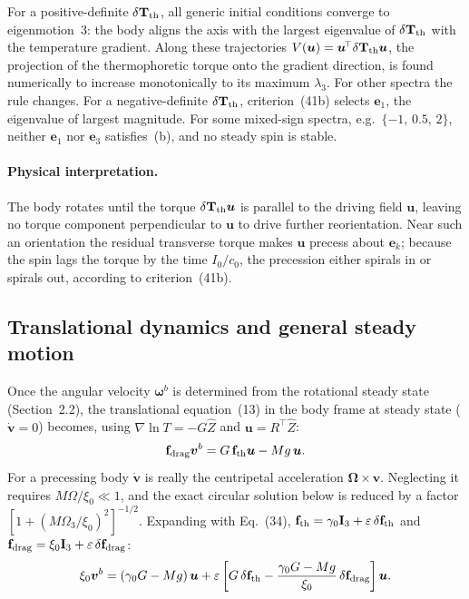 \documentclass[11pt]{article}
\newcommand{\chg}[1]{\marginpar{\raggedright\footnotesize\textcolor{red!70!black}{\textsf{#1}}}}
\newcommand{\vect}[1]{\bm{#1}}
\newcommand{\T}{^{\!\top}}
\begin{document}
For a positive-definite $\delta\mathbf T_{\rm th}$, all generic initial conditions converge to eigenmotion~3: the body aligns the axis with the largest eigenvalue of $\delta\mathbf T_{\rm th}$ with the temperature gradient. Along these trajectories $V(\vect u)=\vect u\T\delta\mathbf T_{\rm th}\vect u$, the projection of the thermophoretic torque onto the gradient direction, is found numerically to increase monotonically to its maximum $\lambda_3$. For other spectra the rule changes. For a negative-definite $\delta\mathbf T_{\rm th}$, criterion~(41b) selects $\vect e_1$, the eigenvalue of largest magnitude. For some mixed-sign spectra, e.g.\ $\{-1,\,0.5,\,2\}$, neither $\vect e_1$ nor $\vect e_3$ satisfies~(b), and no steady spin is stable.

\paragraph{Physical interpretation.} The body rotates until the torque $\delta\mathbf T_{\rm th}\vect u$ is parallel to the driving field $\vect u$, leaving no torque component perpendicular to $\vect u$ to drive further reorientation. Near such an orientation the residual transverse torque makes $\vect u$ precess about $\vect e_k$; because the spin lags the torque by the time $I_0/c_0$, the precession either spirals in or spirals out, according to criterion~(41b).

\subsection{Translational dynamics and general steady motion}
Once the angular velocity $\vect\omega^b$ is determined from the rotational steady state (Section~2.2), the translational equation~(13) in the body frame at steady state ($\dot{\vect v}=0$) becomes, using $\nabla\ln T=-G\hat Z$ and $\vect u=R\T\hat Z$:
\begin{equation}
  \mathbf f_{\rm drag}\vect v^b=G\,\mathbf f_{\rm th}\vect u-Mg\,\vect u.
\end{equation}
For a precessing body $\dot{\vect v}$ is really the centripetal acceleration $\vect\Omega\times\vect v$. Neglecting it requires $M\Omega/\xi_0\ll1$, and the exact circular solution below is reduced by a factor $[1+(M\Omega_3/\xi_0)^2]^{-1/2}$.\chg{C12} Expanding with Eq.~(34), $\mathbf f_{\rm th}=\gamma_0\mathbf I_3+\varepsilon\,\delta\mathbf f_{\rm th}$ and $\mathbf f_{\rm drag}=\xi_0\mathbf I_3+\varepsilon\,\delta\mathbf f_{\rm drag}$:
\begin{equation}
  \xi_0\vect v^b=(\gamma_0G-Mg)\,\vect u+\varepsilon\left[G\,\delta\mathbf f_{\rm th}-\frac{\gamma_0G-Mg}{\xi_0}\,\delta\mathbf f_{\rm drag}\right]\vect u .
\end{equation}
\end{document}
